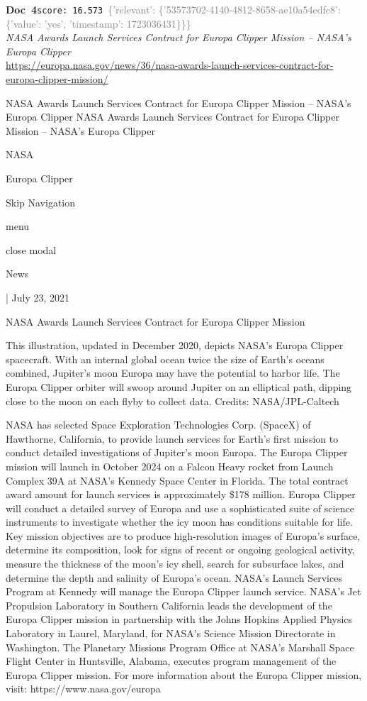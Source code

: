 \documentclass[a4paper,11pt]{article}
\begin{document}
\begin{docenv}
{\footnotesize\textcolor{doccolor}{\textbf{Doc~4}}}\hfill{\tiny\texttt{score:~16.573}}\ {\tiny\textcolor{gray}{\{'relevant': \{'53573702-4140-4812-8658-ae10a54edfc8': \{'value': 'yes', 'timestamp': 1723036431\}\}\}}}\\[3pt]
{\small\textit{NASA Awards Launch Services Contract for Europa Clipper Mission – NASA's Europa Clipper}}\\[2pt]
{\tiny\url{https://europa.nasa.gov/news/36/nasa-awards-launch-services-contract-for-europa-clipper-mission/}}\\[4pt]
{\footnotesize NASA Awards Launch Services Contract for Europa Clipper Mission – NASA's Europa Clipper
NASA Awards Launch Services Contract for Europa Clipper Mission – NASA's Europa Clipper

NASA

Europa Clipper

Skip Navigation

menu

close modal

News

| July 23, 2021

NASA Awards Launch Services Contract for Europa Clipper Mission

This illustration, updated in December 2020, depicts NASA's Europa Clipper spacecraft. With an internal global ocean twice the size of Earth's oceans combined, Jupiter's moon Europa may have the potential to harbor life. The Europa Clipper orbiter will swoop around Jupiter on an elliptical path, dipping close to the moon on each flyby to collect data. Credits: NASA/JPL-Caltech

NASA has selected Space Exploration Technologies Corp. (SpaceX) of Hawthorne, California, to provide launch services for Earth’s first mission to conduct detailed investigations of Jupiter's moon Europa.
The Europa Clipper mission will launch in October 2024 on a Falcon Heavy rocket from Launch Complex 39A at NASA’s Kennedy Space Center in Florida. The total contract award amount for launch services is approximately \$178 million.
Europa Clipper will conduct a detailed survey of Europa and use a sophisticated suite of science instruments to investigate whether the icy moon has conditions suitable for life. Key mission objectives are to produce high-resolution images of Europa's surface, determine its composition, look for signs of recent or ongoing geological activity, measure the thickness of the moon’s icy shell, search for subsurface lakes, and determine the depth and salinity of Europa's ocean.
NASA’s Launch Services Program at Kennedy will manage the Europa Clipper launch service. NASA's Jet Propulsion Laboratory in Southern California leads the development of the Europa Clipper mission in partnership with the Johns Hopkins Applied Physics Laboratory in Laurel, Maryland, for NASA’s Science Mission Directorate in Washington. The Planetary Missions Program Office at NASA’s Marshall Space Flight Center in Huntsville, Alabama, executes program management of the Europa Clipper mission.
For more information about the Europa Clipper mission, visit:
https://www.nasa.gov/europa

}
\end{docenv}
\end{document}
